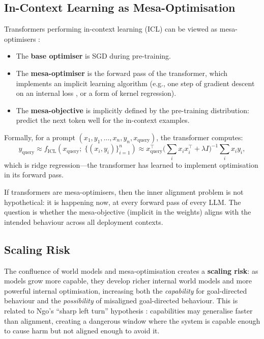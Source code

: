 \documentclass[11pt,a4paper]{article}
\theoremstyle{definition}
\begin{document}
\subsection{In-Context Learning as Mesa-Optimisation}

Transformers performing in-context learning (ICL) can be viewed as
mesa-optimisers \cite{von2023transformers,akyurek2023what}:
\begin{itemize}
  \item The \textbf{base optimiser} is SGD during pre-training.
  \item The \textbf{mesa-optimiser} is the forward pass of the
    transformer, which implements an implicit learning algorithm
    (e.g., one step of gradient descent on an internal loss
    \cite{von2023transformers}, or a form of kernel regression).
  \item The \textbf{mesa-objective} is implicitly defined by the
    pre-training distribution: predict the next token well for the
    in-context examples.
\end{itemize}

Formally, for a prompt $(x_1, y_1, \ldots, x_n, y_n, x_{\text{query}})$,
the transformer computes:
\begin{equation}
  y_{\text{query}} \approx f_{\mathrm{ICL}}(x_{\text{query}};\;
    \{(x_i, y_i)\}_{i=1}^n)
  \approx x_{\text{query}}^\top
    \Big(\sum_i x_i x_i^\top + \lambda I\Big)^{-1}
    \sum_i x_i y_i,
\end{equation}
which is ridge regression---the transformer has learned to implement
optimisation in its forward pass.

\begin{keyinsight}
If transformers are mesa-optimisers, then the inner alignment problem is
not hypothetical: it is happening now, at every forward pass of every
LLM. The question is whether the mesa-objective (implicit in the
weights) aligns with the intended behaviour across all deployment
contexts.
\end{keyinsight}

\subsection{Scaling Risk}

The confluence of world models and mesa-optimisation creates a
\textbf{scaling risk}: as models grow more capable, they develop richer
internal world models and more powerful internal optimisation, increasing
both the \emph{capability} for goal-directed behaviour and the
\emph{possibility} of misaligned goal-directed behaviour. This is
related to Ngo's ``sharp left turn'' hypothesis \cite{ngo2022alignment}:
capabilities may generalise faster than alignment, creating a dangerous
window where the system is capable enough to cause harm but not aligned
enough to avoid it.
\end{document}
